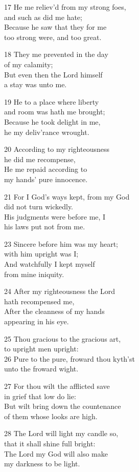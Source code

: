 \begin{multicols}{3}
17 He me reliev’d from my strong foes,\\
and such as did me hate;\\
Because he saw that they for me\\
too strong were, and too great.

18 They me prevented in the day\\
of my calamity;\\
But even then the Lord himself\\
a stay was unto me.

19 He to a place where liberty\\
and room was hath me brought;\\
Because he took delight in me,\\
he my deliv’rance wrought.

20 According to my righteousness\\
he did me recompense,\\
He me repaid according to\\
my hands’ pure innocence.

21 For I God’s ways kept, from my God\\
did not turn wickedly.\\
His judgments were before me, I\\
his laws put not from me.

23 Sincere before him was my heart;\\
with him upright was I;\\
And watchfully I kept myself\\
from mine iniquity.

24 After my righteousness the Lord\\
hath recompensed me,\\
After the cleanness of my hands\\
appearing in his eye.

25 Thou gracious to the gracious art,\\
to upright men upright:\\
26 Pure to the pure, froward thou kyth’st\\
unto the froward wight.

27 For thou wilt the afflicted save\\
in grief that low do lie:\\
But wilt bring down the countenance\\
of them whose looks are high.

28 The Lord will light my candle so,\\
that it shall shine full bright:\\
The Lord my God will also make\\
my darkness to be light.


\end{multicols}
